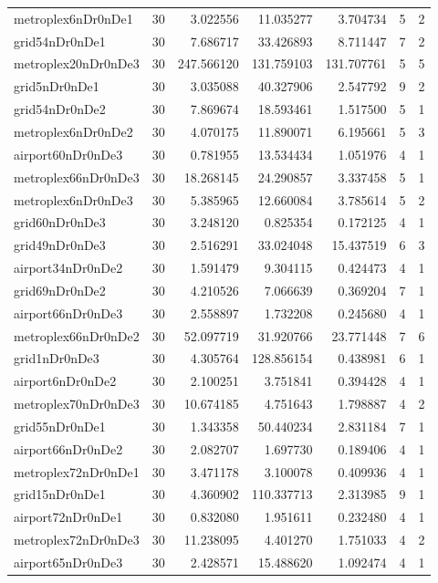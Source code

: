 \documentclass[../../../thesis.tex]{subfiles}
\begin{document}
\begin{longtable}{|l|r|r|r|r|r|r|}
metroplex6nDr0nDe1 & 30 & 3.022556 & 11.035277 & 3.704734 & 5 & 2 \\
grid54nDr0nDe1 & 30 & 7.686717 & 33.426893 & 8.711447 & 7 & 2 \\
metroplex20nDr0nDe3 & 30 & 247.566120 & 131.759103 & 131.707761 & 5 & 5 \\
grid5nDr0nDe1 & 30 & 3.035088 & 40.327906 & 2.547792 & 9 & 2 \\
grid54nDr0nDe2 & 30 & 7.869674 & 18.593461 & 1.517500 & 5 & 1 \\
metroplex6nDr0nDe2 & 30 & 4.070175 & 11.890071 & 6.195661 & 5 & 3 \\
airport60nDr0nDe3 & 30 & 0.781955 & 13.534434 & 1.051976 & 4 & 1 \\
metroplex66nDr0nDe3 & 30 & 18.268145 & 24.290857 & 3.337458 & 5 & 1 \\
metroplex6nDr0nDe3 & 30 & 5.385965 & 12.660084 & 3.785614 & 5 & 2 \\
grid60nDr0nDe3 & 30 & 3.248120 & 0.825354 & 0.172125 & 4 & 1 \\
grid49nDr0nDe3 & 30 & 2.516291 & 33.024048 & 15.437519 & 6 & 3 \\
airport34nDr0nDe2 & 30 & 1.591479 & 9.304115 & 0.424473 & 4 & 1 \\
grid69nDr0nDe2 & 30 & 4.210526 & 7.066639 & 0.369204 & 7 & 1 \\
airport66nDr0nDe3 & 30 & 2.558897 & 1.732208 & 0.245680 & 4 & 1 \\
metroplex66nDr0nDe2 & 30 & 52.097719 & 31.920766 & 23.771448 & 7 & 6 \\
grid1nDr0nDe3 & 30 & 4.305764 & 128.856154 & 0.438981 & 6 & 1 \\
airport6nDr0nDe2 & 30 & 2.100251 & 3.751841 & 0.394428 & 4 & 1 \\
metroplex70nDr0nDe3 & 30 & 10.674185 & 4.751643 & 1.798887 & 4 & 2 \\
grid55nDr0nDe1 & 30 & 1.343358 & 50.440234 & 2.831184 & 7 & 1 \\
airport66nDr0nDe2 & 30 & 2.082707 & 1.697730 & 0.189406 & 4 & 1 \\
metroplex72nDr0nDe1 & 30 & 3.471178 & 3.100078 & 0.409936 & 4 & 1 \\
grid15nDr0nDe1 & 30 & 4.360902 & 110.337713 & 2.313985 & 9 & 1 \\
airport72nDr0nDe1 & 30 & 0.832080 & 1.951611 & 0.232480 & 4 & 1 \\
metroplex72nDr0nDe3 & 30 & 11.238095 & 4.401270 & 1.751033 & 4 & 2 \\
airport65nDr0nDe3 & 30 & 2.428571 & 15.488620 & 1.092474 & 4 & 1 \\

\end{longtable}
\end{document}
